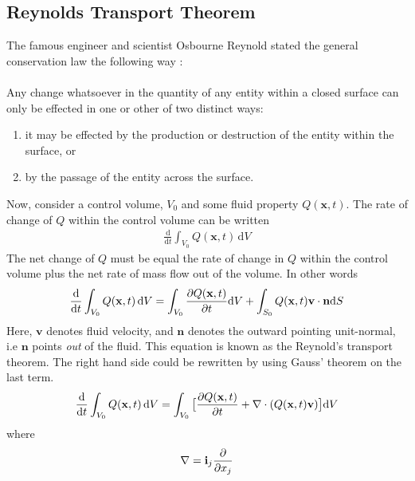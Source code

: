 \subsection{Reynolds Transport Theorem}
The famous engineer and scientist Osbourne Reynold stated the general conservation law the following way \cite{Reyn1903}:
\\
\\
Any change whatsoever in the quantity of any entity within a closed surface can only be effected in one or other of two distinct ways:
\begin{enumerate}
\item it may be effected by the production or destruction of the entity within the surface, or
\item by the passage of the entity across the surface.
\end{enumerate}

Now, consider a control volume, $V_0$ and some fluid property $Q(\mathbf{x},t)$. The rate of change of $Q$ within the control volume can be written
\begin{align}
\frac{\mathrm{d}}{\mathrm{d}t} \int_{V_0} Q(\mathbf{x},t) \, \mathrm{d}V \label{Rate_of_change}
\end{align}
The net change of $Q$ must be equal the rate of change in $Q$ within the control volume plus the net rate of mass flow out of the volume. In other words
\begin{align}
\frac{\mathrm{d}}{\mathrm{d}t} \int_{V_0} Q(\mathbf{x},t) \, \mathrm{d}V = \int_{V_0} \frac{\partial Q(\mathbf{x},t)}{\partial t} \mathrm{d}V + \int_{S_0} Q(\mathbf{x},t) \mathbf{v} \cdot \mathbf{n} \mathrm{d}S \label{Reynolds}
\end{align}
Here, $\mathbf{v}$ denotes fluid velocity, and $\mathbf{n}$ denotes the outward pointing unit-normal, i.e $\mathbf{n}$ points \textit{out} of the fluid. This equation is known as the Reynold's transport theorem. The right hand side could be rewritten by using Gauss' theorem on the last term. 
\begin{align}
\frac{\mathrm{d}}{\mathrm{d}t} \int_{V_0} Q(\mathbf{x},t) \, \mathrm{d}V = \int_{V_0} \big{[}\frac{\partial Q(\mathbf{x},t)}{\partial t} + \nabla \cdot (Q(\mathbf{x},t) \mathbf{v}) \big{]}\mathrm{d}V \label{Reynold}
\end{align}
where \[ \nabla = \mathbf{i}_j\frac{\partial }{\partial x_j} \]

